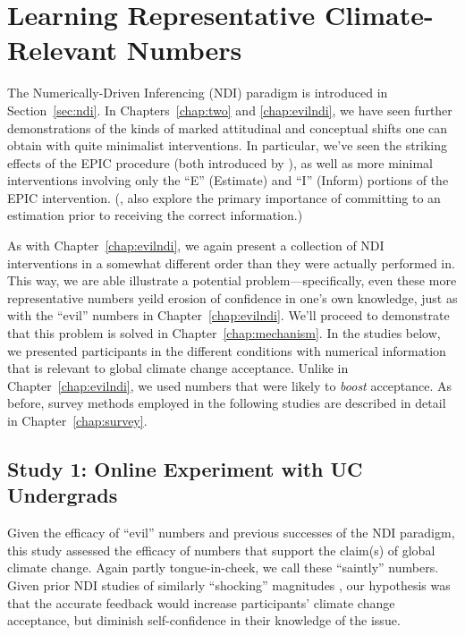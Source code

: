 \graphicspath{{pro-ndi/}}

\chapter{Learning Representative Climate-Relevant Numbers}
\label{chap:prondi}

The Numerically-Driven Inferencing (NDI) paradigm is introduced in Section~\ref{sec:ndi}.
In Chapters~\ref{chap:two} and \ref{chap:evilndi}, we have seen further
demonstrations of the kinds of marked attitudinal and conceptual shifts one can
obtain with quite minimalist interventions. In particular, we've seen the
striking effects of the EPIC procedure (both introduced by
\cite{ranney_numerically_2001_fixed}), as well as more minimal
interventions involving only the “E” (Estimate) and “I” (Inform) portions of the
EPIC intervention. (\cite{rinne_estimation_2006}, also explore the primary
importance of committing to an estimation prior to receiving the correct
information.)

As with Chapter~\ref{chap:evilndi}, we again present a collection of NDI
interventions in a somewhat different order than they were actually performed
in. This way, we are able illustrate a potential problem---specifically, even
these more representative numbers yeild erosion
of confidence in one's own knowledge, just as with the “evil” numbers in
Chapter~\ref{chap:evilndi}. We'll proceed to demonstrate that this problem is solved in
Chapter~\ref{chap:mechanism}.  In the studies below, we presented participants
in the different conditions with numerical information that is relevant to
global climate change acceptance.  Unlike in Chapter~\ref{chap:evilndi}, we used
numbers that were likely to \emph{boost} acceptance. As before, survey methods employed
in the following studies are described in detail in Chapter~\ref{chap:survey}.

\section{Study 1: Online Experiment with UC Undergrads}
\label{sec:pro-uc}

Given the efficacy of “evil” numbers and previous successes of the NDI paradigm,
this study assessed the efficacy of numbers that support the claim(s) of global
climate change. Again partly tongue-in-cheek, we call these “saintly” numbers.
Given prior NDI studies of similarly “shocking” magnitudes
\parencite[e.g.,][]{garcia_de_osuna_qualitative_2004}, our hypothesis was that
the accurate feedback would increase participants’ climate change acceptance,
but diminish self-confidence in their knowledge of the issue.


